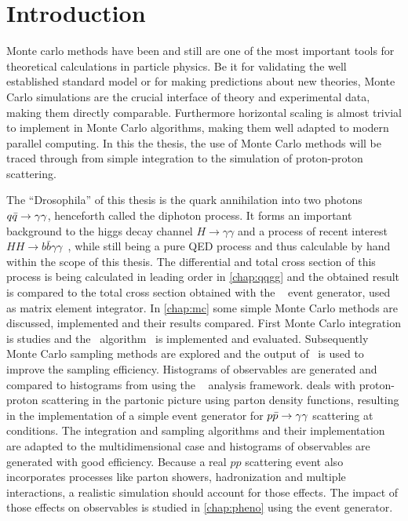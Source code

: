 \chapter{Introduction}%
\label{chap:intro}

Monte carlo methods have been and still are one of the most important
tools for theoretical calculations in particle physics. Be it for
validating the well established standard model or for making
predictions about new theories, Monte Carlo simulations are the
crucial interface of theory and experimental data, making them
directly comparable. Furthermore horizontal scaling is almost trivial
to implement in Monte Carlo algorithms, making them well adapted to
modern parallel computing. In this the thesis, the use of Monte Carlo
methods will be traced through from simple integration to the
simulation of proton-proton scattering.

The ``Drosophila'' of this thesis is the quark annihilation into two
photons \(q\bar{q}\rightarrow\gamma\gamma\), henceforth called the diphoton process. It forms an
important background to the higgs decay channel
\(H\rightarrow \gamma\gamma\) and a process of recent interest
\(HH\rightarrow b\bar{b}\gamma\gamma\)~\cite{aaboud2018:sf}, while
still being a pure QED process and thus calculable by hand within the
scope of this thesis. The differential and total cross section of this
process is being calculated in leading order in \cref{chap:qqgg} and
the obtained result is compared to the total cross section obtained
with the \sherpa~\cite{Gleisberg:2008ta} event generator, used as
matrix element integrator. In \cref{chap:mc} some simple Monte Carlo
methods are discussed, implemented and their results compared. First
Monte Carlo integration is studies and the \vegas\
algorithm~\cite{Lepage:19781an} is implemented and
evaluated. Subsequently Monte Carlo sampling methods are explored and
the output of \vegas\ is used to improve the sampling
efficiency. Histograms of observables are generated and compared to
histograms from \sherpa using the \rivet~\cite{Bierlich:2019rhm}
analysis framework. \Cref{chap:pdf} deals with proton-proton
scattering in the partonic picture using parton density functions,
resulting in the implementation of a simple event generator for
\(p\bar{p}\rightarrow\gamma\gamma\) scattering at \lhc conditions. The integration and sampling
algorithms and their implementation are adapted to the
multidimensional case and histograms of observables are generated with
good efficiency.  Because a real \(pp\) scattering event also
incorporates processes like parton showers, hadronization and multiple
interactions, a realistic simulation should account for those
effects. The impact of those effects on observables is studied in
\cref{chap:pheno} using the \sherpa event generator.

